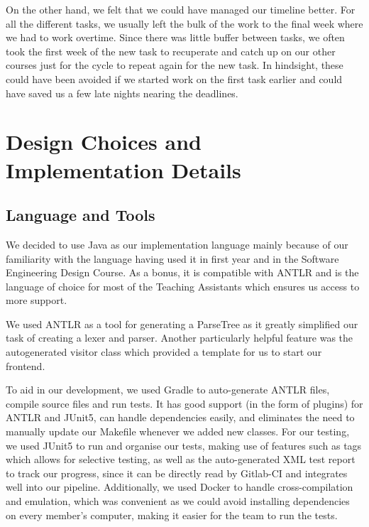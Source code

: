 \documentclass[11pt,a4paper]{article}
\begin{document}
On the other hand, we felt that we could have managed our timeline better. For all the different tasks, we usually left the bulk of the work to the final week where we had to work overtime. Since there was little buffer between tasks, we often took the first week of the new task to recuperate and catch up on our other courses just for the cycle to repeat again for the new task. In hindsight, these could have been avoided if we started work on the first task earlier and could have saved us a few late nights nearing the deadlines.


\section{Design Choices and Implementation Details}
\subsection{Language and Tools}
We decided to use Java as our implementation language mainly because of our familiarity with the language having used it in first year and in the Software Engineering Design Course. As a bonus, it is compatible with ANTLR and is the language of choice for most of the Teaching Assistants which ensures us access to more support. 

We used ANTLR as a tool for generating a ParseTree as it greatly simplified our task of creating a lexer and parser. Another particularly helpful feature was the autogenerated visitor class which provided a template for us to start our frontend.

To aid in our development, we used Gradle to auto-generate ANTLR files, compile source files and run tests. It has good support (in the form of plugins) for ANTLR and JUnit5, can handle dependencies easily, and eliminates the need to manually update our Makefile whenever we added new classes. For our testing, we used JUnit5 to run and organise our tests, making use of features such as tags which allows for selective testing, as well as the auto-generated XML test report to track our progress, since it can be directly read by Gitlab-CI and integrates well into our pipeline. Additionally, we used Docker to handle cross-compilation and emulation, which was convenient as we could avoid installing dependencies on every member’s computer, making it easier for the team to run the tests.
\end{document}
